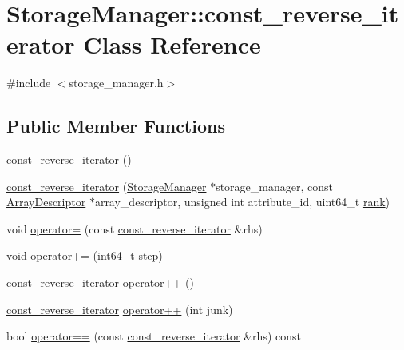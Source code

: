 \hypertarget{classStorageManager_1_1const__reverse__iterator}{}\section{Storage\+Manager\+:\+:const\+\_\+reverse\+\_\+iterator Class Reference}
\label{classStorageManager_1_1const__reverse__iterator}


{\ttfamily \#include $<$storage\+\_\+manager.\+h$>$}

\subsection*{Public Member Functions}
\begin{DoxyCompactItemize}
\item 
\hyperlink{classStorageManager_1_1const__reverse__iterator_a0ede00368f2bcd4e761f48c7ca78556c}{const\+\_\+reverse\+\_\+iterator} ()
\item 
\hyperlink{classStorageManager_1_1const__reverse__iterator_a7d3549b2392cff33e55a34e111b3aec8}{const\+\_\+reverse\+\_\+iterator} (\hyperlink{classStorageManager}{Storage\+Manager} $\ast$storage\+\_\+manager, const \hyperlink{classStorageManager_1_1ArrayDescriptor}{Array\+Descriptor} $\ast$array\+\_\+descriptor, unsigned int attribute\+\_\+id, uint64\+\_\+t \hyperlink{classStorageManager_1_1const__reverse__iterator_a594d641b4827b839a323c14206699f9a}{rank})
\item 
void \hyperlink{classStorageManager_1_1const__reverse__iterator_abd311397eeacd147352c05a093326a6a}{operator=} (const \hyperlink{classStorageManager_1_1const__reverse__iterator}{const\+\_\+reverse\+\_\+iterator} \&rhs)
\item 
void \hyperlink{classStorageManager_1_1const__reverse__iterator_a897e3a4f8494ac256fec15b4ac8b0cd3}{operator+=} (int64\+\_\+t step)
\item 
\hyperlink{classStorageManager_1_1const__reverse__iterator}{const\+\_\+reverse\+\_\+iterator} \hyperlink{classStorageManager_1_1const__reverse__iterator_a52d5ba9ac993f75872043d6cd2b3f85d}{operator++} ()
\item 
\hyperlink{classStorageManager_1_1const__reverse__iterator}{const\+\_\+reverse\+\_\+iterator} \hyperlink{classStorageManager_1_1const__reverse__iterator_a3f282dd92d2e84368c323a00c61c9994}{operator++} (int junk)
\item 
bool \hyperlink{classStorageManager_1_1const__reverse__iterator_a2ba6e3d6a17becff23b6c95d8cd6024c}{operator==} (const \hyperlink{classStorageManager_1_1const__reverse__iterator}{const\+\_\+reverse\+\_\+iterator} \&rhs) const 

\end{DoxyCompactItemize}
